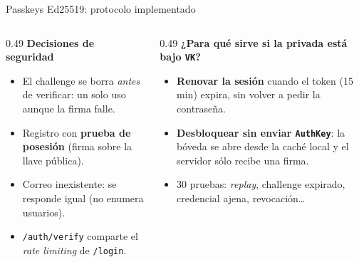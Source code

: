 \documentclass[aspectratio=169,10pt]{beamer}
\newcommand{\key}[1]{\textcolor{cripto}{\texttt{#1}}}
\begin{document}
\begin{frame}{Passkeys Ed25519: protocolo implementado}
  \vspace{1mm}
  \scriptsize
  \begin{columns}[T]
    \begin{column}{0.49\textwidth}
      \textbf{Decisiones de seguridad}
      \begin{itemize}
        \item El challenge se borra \emph{antes} de verificar: un solo uso aunque la firma falle.
        \item Registro con \textbf{prueba de posesión} (firma sobre la llave pública).
        \item Correo inexistente: se responde igual (no enumera usuarios).
        \item \texttt{/auth/verify} comparte el \emph{rate limiting} de \texttt{/login}.
      \end{itemize}
    \end{column}
    \begin{column}{0.49\textwidth}
      \textbf{¿Para qué sirve si la privada está bajo \key{VK}?}
      \begin{itemize}
        \item \textbf{Renovar la sesión} cuando el token (15\,min) expira, sin volver a pedir la contraseña.
        \item \textbf{Desbloquear sin enviar \key{AuthKey}}: la bóveda se abre desde la caché local
              y el servidor sólo recibe una firma.
        \item 30 pruebas: \emph{replay}, challenge expirado, credencial ajena, revocación\ldots
      \end{itemize}
    \end{column}
  \end{columns}
\end{frame}
\end{document}
